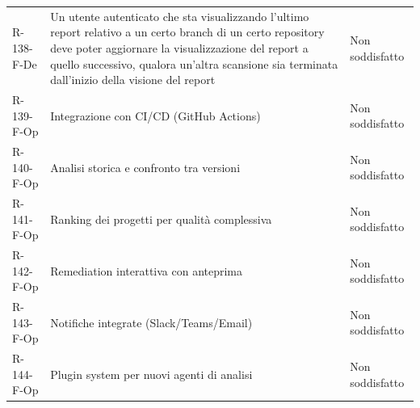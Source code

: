 \documentclass[a4paper, 11pt]{article}
\begin{document}
\begin{longtable}[c]{ >{\centering\arraybackslash}m{2.5cm} >{\centering\arraybackslash}m{8.3cm} >{\centering\arraybackslash}m{3.5cm} }
R-138-F-De & Un utente autenticato che sta visualizzando l'ultimo report relativo a un certo branch di un certo repository deve poter aggiornare la visualizzazione del report a quello successivo, qualora un'altra scansione sia terminata dall'inizio della visione del report & Non soddisfatto\\
R-139-F-Op & Integrazione con CI/CD (GitHub Actions) & Non soddisfatto\\
R-140-F-Op & Analisi storica e confronto tra versioni & Non soddisfatto\\
R-141-F-Op & Ranking dei progetti per qualità complessiva & Non soddisfatto\\
R-142-F-Op & Remediation interattiva con anteprima & Non soddisfatto\\
R-143-F-Op & Notifiche integrate (Slack/Teams/Email) & Non soddisfatto\\
R-144-F-Op & Plugin system per nuovi agenti di analisi & Non soddisfatto\\

\end{longtable}
\end{document}
